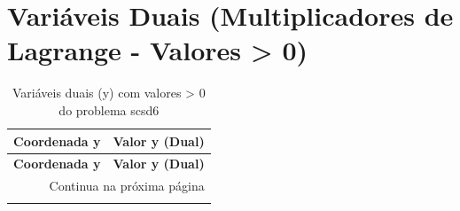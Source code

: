 \documentclass[12pt]{article}
\begin{document}
\section{Variáveis Duais (Multiplicadores de Lagrange - Valores > 0)}

\begin{longtable}{@{}cc@{}}
\caption{Variáveis duais (y) com valores > 0 do problema scsd6} \\
\toprule
\textbf{Coordenada y} & \textbf{Valor y (Dual)} \\
\midrule
\endfirsthead

\toprule
\textbf{Coordenada y} & \textbf{Valor y (Dual)} \\
\midrule
\endhead

\midrule \multicolumn{2}{r}{{Continua na próxima página}} \\ \midrule
\endfoot


\end{longtable}
\end{document}
